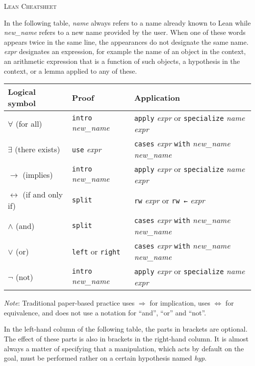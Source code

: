\documentclass[a4paper]{article}
\newcommand{\lean}[1]{{\tt #1}}
\newcommand{\nv}{\textit{new\_name} }
\newcommand{\nom}{\textit{name} }
\newcommand{\expr}{\textit{expr} }
\newcommand{\hyp}{\textit{hyp}\xspace}
\begin{document}
\pagestyle{empty}
\begin{center}
	\large\textsc{Lean Cheatsheet}
\end{center}

In the following table,
\nom always refers to a name already known to Lean
while \nv refers to a new name provided by the user.
When one of these words appears twice in the same line,
the appearances do not designate the same name.
\expr designates an expression,
for example the name of an object in the context,
an arithmetic expression that is a function of such objects,
a hypothesis in the context,
or a lemma applied to any of these.

\begin{center}
\setlength\tabcolsep{1.6cm}
\def\arraystretch{1.5}
\begin{tabular}{@{}lll@{}}
  \toprule
  Logical symbol & Proof & Application \\
  \midrule
	$\forall$	(for all) & \lean{intro} \nv & \lean{apply} \expr or \lean{specialize} \nom \expr  \\
	$\exists$	(there exists) & \lean{use} \expr & \lean{cases} \expr \lean{with} \nv \nv \\
	$\to$ (implies) & \lean{intro} \nv & \lean{apply} \expr or \lean{specialize} \nom \expr \\
	$\leftrightarrow$ (if and only if) & \lean{split}  & \lean{rw} \expr or \lean{rw ←} \expr\\
	$\land$ (and) & \lean{split} & \lean{cases} \expr \lean{with} \nv \nv \\
	$\lor$ (or) & \lean{left} or \lean{right} & \lean{cases} \expr \lean{with} \nv \nv \\
	$\lnot$ (not) & \lean{intro} \nv & \lean{apply} \expr or \lean{specialize} \nom \expr  \\
  \bottomrule
\end{tabular}
\end{center}

\noindent
\emph{Note}:
Traditional paper-based practice uses $\Rightarrow$ for implication,
uses $\iff$ for equivalence,
and does not use a notation for ``and'', ``or'' and ``not''.

\medskip
\noindent
In the left-hand column of the following table,
the parts in brackets are optional.
The effect of these parts is also in brackets in the right-hand column.
It is almost always a matter of specifying that a manipulation,
which acts by default on the goal,
must be performed rather on a certain hypothesis named \hyp.
\end{document}
